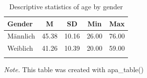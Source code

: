 \documentclass[floatsintext,man]{apa6}
\theoremstyle{definition}
\theoremstyle{definition}
\theoremstyle{definition}
\theoremstyle{remark}
\begin{document}
\begin{table}[tbp]
\begin{center}
\begin{threeparttable}
\caption{\label{tab:unnamed-chunk-5}Descriptive statistics of age by gender}
\begin{tabular}{lllll}
\toprule
Gender & \multicolumn{1}{c}{M} & \multicolumn{1}{c}{SD} & \multicolumn{1}{c}{Min} & \multicolumn{1}{c}{Max}\\
\midrule
Männlich & 45.38 & 10.16 & 26.00 & 76.00\\
Weiblich & 41.26 & 10.39 & 20.00 & 59.00\\
\bottomrule
\addlinespace
\end{tabular}
\begin{tablenotes}[para]
\textit{Note.} This table was created with apa\_table()
\end{tablenotes}
\end{threeparttable}
\end{center}
\end{table}

\newpage

\setlength{\parindent}{-0.5in}
\setlength{\leftskip}{0.5in}
\end{document}
